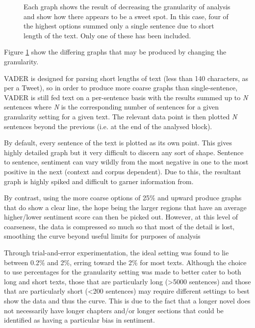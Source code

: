 \documentclass{article}
\begin{document}
{\begin{figure}
            \centering
            \caption{Each graph shows the result of decreasing the granularity of analysis and show how there appears to be a sweet spot. In this case, four of the highest options summed only a single sentence due to short length of the text. Only one of these has been included.}
            \label{fig:cinderellaGran}
        \end{figure}
        Figure \ref{fig:cinderellaGran} show the differing graphs that may be produced by changing the granularity.

        VADER is designed for parsing short lengths of text (less than 140 characters, as per a Tweet), so in order to produce more coarse graphs than single-sentence, VADER is still fed text on a per-sentence basis with the results summed up to \textit{N} sentences where \textit{N} is the corresponding number of sentences for a given granularity setting for a given text. The relevant data point is then plotted \textit{N} sentences beyond the previous (i.e. at the end of the analysed block).

        By default, every sentence of the text is plotted as its own point. This gives highly detailed graph but it very difficult to discern any sort of shape. Sentence to sentence, sentiment can vary wildly from the most negative in one to the most positive in the next (context and corpus dependent). Due to this, the resultant graph is highly spiked and difficult to garner information from.

        By contrast, using the more coarse options of 25\% and upward produce graphs that do show a clear line, the hope being the larger regions that have an average higher/lower sentiment score can then be picked out. However, at this level of coarseness, the data is compressed so much so that most of the detail is lost, smoothing the curve beyond useful limits for purposes of analysis

        Through trial-and-error experimentation, the ideal setting was found to lie between 0.2\% and 2\%, erring toward the 2\% for most texts. Although the choice to use percentages for the granularity setting was made to better cater to both long and short texts, those that are particularly long (>5000 sentences) and those that are particularly short (<200 sentences) may require different settings to best show the data and thus the curve. This is due to the fact that a longer novel does not necessarily have longer chapters and/or longer sections that could be identified as having a particular bias in sentiment.
        
}
\end{document}
